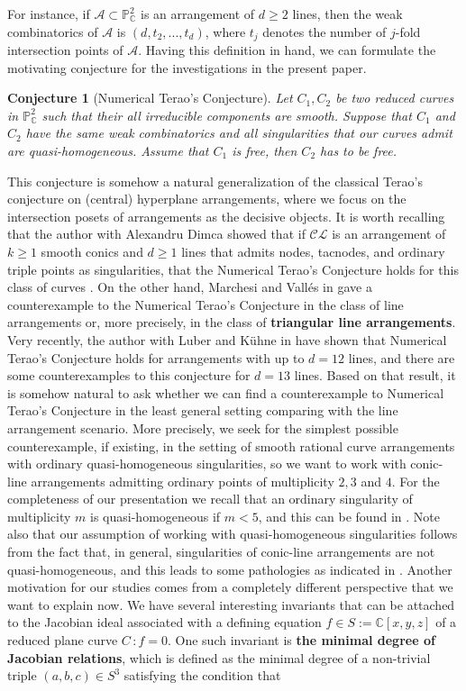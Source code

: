 \documentclass[12pt]{article}
\theoremstyle{plain}
\newtheorem{conjecture}[thm]{Conjecture}
\theoremstyle{definition}
\renewcommand\geq{\geqslant}
\begin{document}
For instance, if $\mathcal{A} \subset \mathbb{P}^{2}_{\mathbb{C}}$ is an arrangement of $d\geq 2$ lines, then the weak combinatorics of $\mathcal{A}$ is $(d, t_{2}, ..., t_{d})$, where $t_{j}$ denotes the number of $j$-fold intersection points of $\mathcal{A}$.
Having this definition in hand, we can formulate the motivating conjecture for the investigations in the present paper.
\begin{conjecture}[Numerical Terao's Conjecture]
Let $C_{1}, C_{2}$ be two reduced curves in $\mathbb{P}^{2}_{\mathbb{C}}$ such that their all irreducible components are smooth. Suppose that $C_{1}$ and $C_{2}$ have the same weak combinatorics and all singularities that our curves admit are quasi-homogeneous. Assume that $C_{1}$ is free, then $C_{2}$ has to be free.
\end{conjecture}
This conjecture is somehow a natural generalization of the classical Terao's conjecture on (central) hyperplane arrangements, where we focus on the intersection posets of arrangements as the decisive objects. It is worth recalling that the author with Alexandru Dimca showed that if $\mathcal{CL}$ is an arrangement of $k\geq 1$ smooth conics and $d\geq 1$ lines that admits nodes, tacnodes, and ordinary triple points as singularities, that the Numerical Terao's Conjecture holds for this class of curves \cite{DimcaPokora}. On the other hand, Marchesi and Vall\'es in \cite{Mar} gave a counterexample to the Numerical Terao's Conjecture in the class of line arrangements or, more precisely, in the class of \textbf{triangular line arrangements}. Very recently, the author with Luber and K\"uhne in \cite{LKP} have shown that Numerical Terao's Conjecture holds for arrangements with up to $d = 12$ lines, and there are some counterexamples to this conjecture for $d=13$ lines. Based on that result, it is somehow natural to ask whether we can find a counterexample to Numerical Terao's Conjecture in the least general setting comparing with the line arrangement scenario. More precisely, we seek for the simplest possible counterexample, if existing, in the setting of smooth rational curve arrangements with ordinary quasi-homogeneous singularities, so we want to work with conic-line arrangements admitting ordinary points of multiplicity $2,3$ and $4$. For the completeness of our presentation we recall that an ordinary singularity of multiplicity $m$ is quasi-homogeneous if $m<5$, and this can be found in \cite[Exercise 7.31]{RCS}. Note also that our assumption of working with quasi-homogeneous singularities follows from the fact that, in general, singularities of conic-line arrangements are not quasi-homogeneous, and this leads to some pathologies as indicated in \cite[Example 4.6]{Poksur}. Another motivation for our studies comes from a completely different perspective that we want to explain now. We have several interesting invariants that can be attached to the Jacobian ideal associated with a defining equation $f \in S:=\mathbb{C}[x,y,z]$ of a reduced plane curve $C \, : f=0$. One such invariant is \textbf{the minimal degree of Jacobian relations}, which is defined as the minimal degree of a non-trivial triple $(a,b,c) \in S^{3}$ satisfying the condition that
\end{document}
